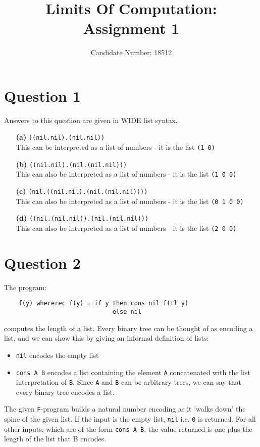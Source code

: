 \documentclass{article}
\title{Limits Of Computation: Assignment 1}
\author{Candidate Number: 18512}
\begin{document}
\maketitle

\section*{Question 1}
Answers to this question are given in WIDE list syntax.
\begin{enumerate}
    \item[\textbf{(a)}] \texttt{((nil.nil).(nil.nil))} \\
        This can be interpreted as a list of numbers - it is the list \texttt{(1 0)}
    \item[\textbf{(b)}] \texttt{((nil.nil).(nil.(nil.nil)))} \\
        This can also be interpreted as a list of numbers - it is the list \texttt{(1 0 0)}
    \item[\textbf{(c)}] \texttt{(nil.((nil.nil).(nil.(nil.nil))))} \\
        This can also be interpreted as a list of numbers - it is the list \texttt{(0 1 0 0)}
    \item[\textbf{(d)}] \texttt{((nil.(nil.nil)).(nil.(nil.nil)))} \\
        This can also be interpreted as a list of numbers - it is the list \texttt{(2 0 0)}
\end{enumerate}

\section*{Question 2}
The program:
\begin{verbatim}
    f(y) whererec f(y) = if y then cons nil f(tl y)
                              else nil
\end{verbatim}
\indent computes the length of a list. Every binary tree can be thought of as encoding a list, and we can show this by giving an informal definition of lists:
\begin{itemize}
    \item \texttt{nil} encodes the empty list
    \item \texttt{cons A B} encodes a list containing the element \texttt{A} concatenated with the list interpretation of \texttt{B}. Since \texttt{A} and \texttt{B} can be arbitrary trees, we can say that every binary tree encodes a list.
\end{itemize}
The given \texttt{F}-program builds a natural number encoding as it 'walks down' the spine of the given list. If the input is the empty list, \texttt{nil} i.e. \texttt{0} is returned. For all other inputs, which are of the form \texttt{cons A B}, the value returned is one plus the length of the list that B encodes.
\end{document}
